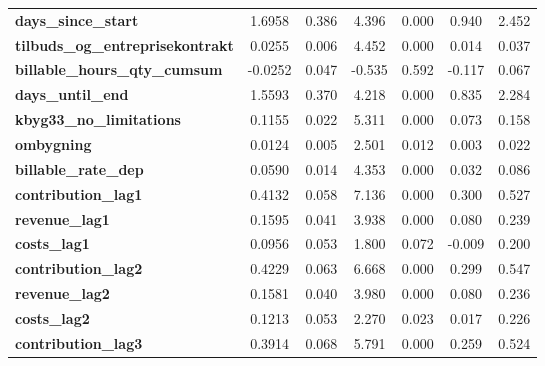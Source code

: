 \begin{center}
\begin{tabular}{lcccccc}
\textbf{days\_since\_start}              &       1.6958  &        0.386     &     4.396  &         0.000        &        0.940    &        2.452     \\
\textbf{tilbuds\_og\_entreprisekontrakt} &       0.0255  &        0.006     &     4.452  &         0.000        &        0.014    &        0.037     \\
\textbf{billable\_hours\_qty\_cumsum}    &      -0.0252  &        0.047     &    -0.535  &         0.592        &       -0.117    &        0.067     \\
\textbf{days\_until\_end}                &       1.5593  &        0.370     &     4.218  &         0.000        &        0.835    &        2.284     \\
\textbf{kbyg33\_no\_limitations}         &       0.1155  &        0.022     &     5.311  &         0.000        &        0.073    &        0.158     \\
\textbf{ombygning}                       &       0.0124  &        0.005     &     2.501  &         0.012        &        0.003    &        0.022     \\
\textbf{billable\_rate\_dep}             &       0.0590  &        0.014     &     4.353  &         0.000        &        0.032    &        0.086     \\
\textbf{contribution\_lag1}              &       0.4132  &        0.058     &     7.136  &         0.000        &        0.300    &        0.527     \\
\textbf{revenue\_lag1}                   &       0.1595  &        0.041     &     3.938  &         0.000        &        0.080    &        0.239     \\
\textbf{costs\_lag1}                     &       0.0956  &        0.053     &     1.800  &         0.072        &       -0.009    &        0.200     \\
\textbf{contribution\_lag2}              &       0.4229  &        0.063     &     6.668  &         0.000        &        0.299    &        0.547     \\
\textbf{revenue\_lag2}                   &       0.1581  &        0.040     &     3.980  &         0.000        &        0.080    &        0.236     \\
\textbf{costs\_lag2}                     &       0.1213  &        0.053     &     2.270  &         0.023        &        0.017    &        0.226     \\
\textbf{contribution\_lag3}              &       0.3914  &        0.068     &     5.791  &         0.000        &        0.259    &        0.524     \\

\end{tabular}
\end{center}
